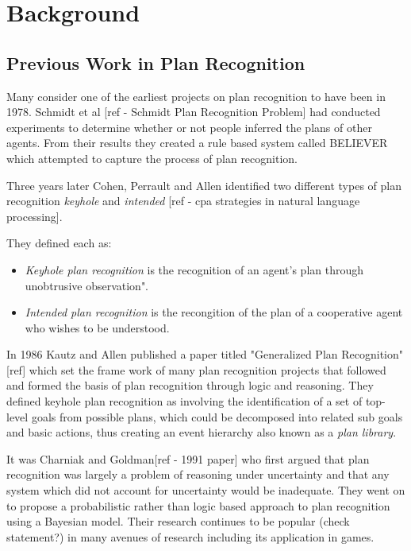 \documentclass[parskip]{cs4rep}
\begin{document}
\chapter{Background}

\section{Previous Work in Plan Recognition}

Many consider one of the earliest projects on plan recognition to have been in 1978. Schmidt et al [ref - Schmidt Plan Recognition Problem] had conducted experiments to determine whether or not people inferred the plans of other agents. From their results they created a rule based system called BELIEVER which attempted to capture the process of plan recognition. 

Three years later Cohen, Perrault and Allen identified two different types of plan recognition \textit{keyhole} and \textit{intended} [ref - cpa strategies in natural language processing]. 

They defined each as:

\begin{itemize}
\item
\textit{Keyhole plan recognition} is the recognition of an agent's plan through unobtrusive observation".
\item
\textit{Intended plan recognition} is the recongition of the plan of a cooperative agent who wishes to be understood.
\newline
\end{itemize}

In 1986 Kautz and Allen published a paper titled "Generalized Plan Recognition"[ref] which set the frame work of many plan recognition projects that followed and formed the basis of plan recognition through logic and reasoning. They defined keyhole plan recognition as involving the identification of a set of top-level goals from possible plans, which could be decomposed into related sub goals and basic actions, thus creating an event hierarchy also known as a \textit{plan library}. 

It was Charniak and Goldman[ref - 1991 paper] who first argued that plan recognition was largely a problem of reasoning under uncertainty and that any system which did not account for uncertainty would be inadequate. They went on to propose a probabilistic rather than logic based approach to  plan recognition using a Bayesian model. Their research continues to be popular (check statement?) in many avenues of research including its application in games.
\end{document}
